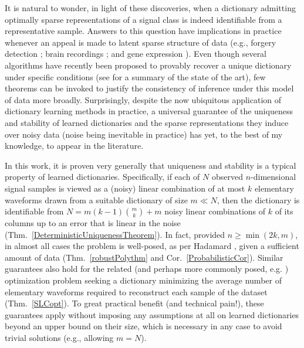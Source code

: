 It is natural to wonder, in light of these discoveries, when a dictionary admitting optimally sparse representations of a signal class is indeed identifiable from a representative sample. Answers to this question have implications in practice whenever an appeal is made to latent sparse structure of data (e.g., forgery detection \cite{hughes2010, olshausen2010applied}; brain recordings \cite{jung2001imaging, agarwal2014spatially, lee2016sparse}; and gene expression \cite{wu2016stability}). 
Even though several algorithms have recently been proposed to provably recover a unique dictionary under specific conditions (see \cite[Sec.~I-E]{Sun16} for a summary of the state of the art), few theorems can be invoked to justify the consistency of inference under this model of data more broadly. Surprisingly, despite the now ubiquitous application of dictionary learning methods in practice, a universal guarantee of the uniqueness and stability of learned dictionaries and the sparse representations they induce over noisy data (noise being inevitable in practice) has yet, to the best of my knowledge, to appear in the literature.

In this work, it is proven very generally that uniqueness and stability is a typical property of learned dictionaries. Specifically, if each of $N$ observed $n$-dimensional signal samples is viewed as a (noisy) linear combination of at most $k$ elementary waveforms drawn from a suitable dictionary of size $m \ll N$, then the dictionary is identifiable from \mbox{$N = m(k-1){m \choose k} + m$} noisy linear combinations of $k$ of its columns up to an error that is linear in the noise (Thm.~\ref{DeterministicUniquenessTheorem}). In fact, provided $n \geq \min(2k,m)$, in almost all cases the problem is well-posed, as per Hadamard \cite{Hadamard1902}, given a sufficient amount of data (Thm.~\ref{robustPolythm} and Cor.~\ref{ProbabilisticCor}). 
Similar guarantees also hold for the related (and perhaps more commonly posed, e.g. \cite{rehnsommer2007}) optimization problem seeking a dictionary minimizing the average number of elementary waveforms required to reconstruct each sample of the dataset (Thm.~\ref{SLCopt}). To great practical benefit (and technical pain!), these guarantees apply without imposing any assumptions at all on learned dictionaries beyond an upper bound on their size, which is necessary in any case to avoid trivial solutions (e.g., allowing $m = N$). %

